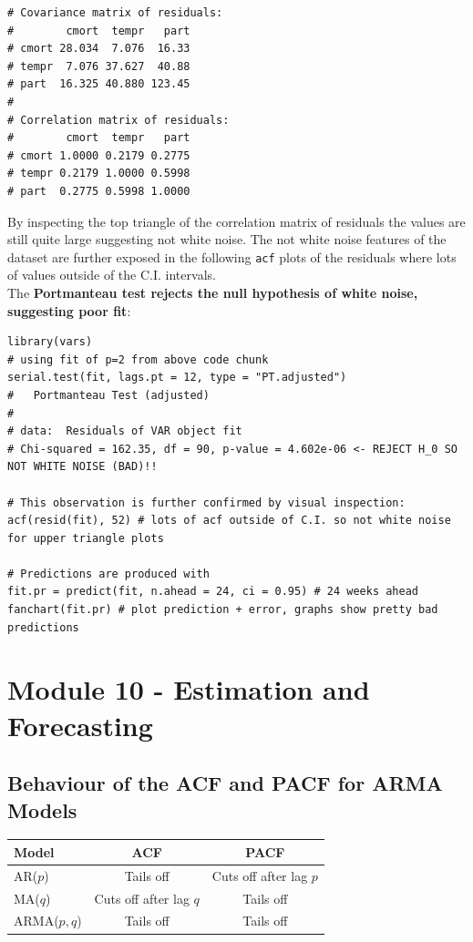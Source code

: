 \documentclass[11pt]{article}
\newcommand{\noi}{\noindent}
\begin{document}
\begin{lstlisting}
# Covariance matrix of residuals:
#        cmort  tempr   part
# cmort 28.034  7.076  16.33
# tempr  7.076 37.627  40.88
# part  16.325 40.880 123.45
# 
# Correlation matrix of residuals:
#        cmort  tempr   part
# cmort 1.0000 0.2179 0.2775
# tempr 0.2179 1.0000 0.5998
# part  0.2775 0.5998 1.0000
\end{lstlisting}
\noi By inspecting the top triangle of the correlation matrix of residuals the values are still quite large suggesting not white noise. The not white noise features of the dataset are further exposed in the following \texttt{acf} plots of the residuals where lots of values outside of the C.I. intervals. \\

\noi The \textbf{Portmanteau test rejects the null hypothesis of white noise, suggesting poor fit}:
\begin{lstlisting}
library(vars)
# using fit of p=2 from above code chunk
serial.test(fit, lags.pt = 12, type = "PT.adjusted")
# 	Portmanteau Test (adjusted)
# 
# data:  Residuals of VAR object fit
# Chi-squared = 162.35, df = 90, p-value = 4.602e-06 <- REJECT H_0 SO NOT WHITE NOISE (BAD)!!

# This observation is further confirmed by visual inspection:
acf(resid(fit), 52) # lots of acf outside of C.I. so not white noise for upper triangle plots

# Predictions are produced with
fit.pr = predict(fit, n.ahead = 24, ci = 0.95) # 24 weeks ahead
fanchart(fit.pr) # plot prediction + error, graphs show pretty bad predictions
\end{lstlisting}


\newpage
\section{Module 10 - Estimation and Forecasting}
\subsection{Behaviour of the ACF and PACF for ARMA Models}
\begin{table}[ht]
\centering
\begin{tabular}{lcc}
\toprule
Model & ACF & PACF \\
\midrule
AR($p$) & Tails off & Cuts off after lag $p$ \\
MA($q$) & Cuts off after lag $q$ & Tails off \\
ARMA($p, q$) & Tails off & Tails off \\
\bottomrule
\end{tabular}
\end{table}
\end{document}
